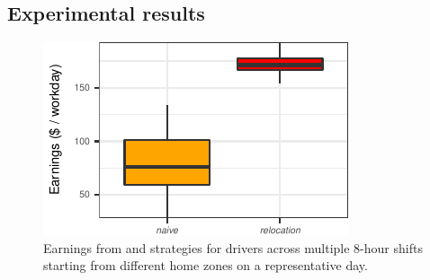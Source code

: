 


\subsection{Experimental results}

\begin{figure}
	\includegraphics{figures/earnings_heatmap.pdf}
	\caption{Earnings from {\naive} and {\relocation} strategies for drivers across multiple 8-hour shifts starting from different home zones on a representative day.}
	\label{fig:earnings_heatmap}
\end{figure}

